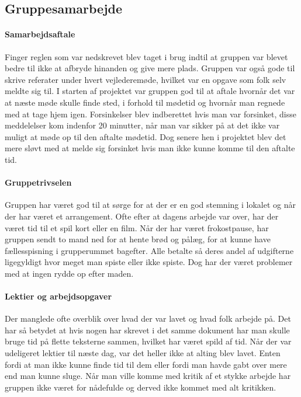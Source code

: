 \subsection{Gruppesamarbejde}
\paragraph{Samarbejdsaftale}
Finger reglen som var nedskrevet blev taget i brug indtil at gruppen var blevet bedre til ikke at afbryde hinanden og give mere plads. Gruppen var også gode til skrive referater under hvert vejlederemøde, hvilket var en opgave som folk selv meldte sig til. I starten af projektet var gruppen god til at aftale hvornår det var at næste møde skulle finde sted, i forhold til mødetid og hvornår man regnede med at tage hjem igen. Forsinkelser blev indberettet hvis man var forsinket, disse meddelelser kom indenfor 20 minutter, når man var sikker på at det ikke var muligt at møde op til den aftalte mødetid. Dog senere hen i projektet blev det mere sløvt med at melde sig forsinket hvis man ikke kunne komme til den aftalte tid.

\paragraph{Gruppetrivselen}
Gruppen har været god til at sørge for at der er en god stemning i lokalet og når der har været et arrangement. Ofte efter at dagens arbejde var over, har der været tid til et spil kort eller en film. Når der har været frokostpause, har gruppen sendt to mand ned for at hente brød og pålæg, for at kunne have fællesspisning i grupperummet bagefter. Alle betalte så deres andel af udgifterne ligegyldigt hvor meget man spiste eller ikke spiste. Dog har der været problemer med at ingen rydde op efter maden.

\paragraph{Lektier og arbejdsopgaver}
Der manglede ofte overblik over hvad der var lavet og hvad folk arbejde på. Det har så betydet at hvis nogen har skrevet i det samme dokument har man skulle bruge tid på flette teksterne sammen, hvilket har været spild af tid. Når der var udeligeret lektier til næste dag, var det heller ikke at alting blev lavet. Enten fordi at man ikke kunne finde tid til dem eller fordi man havde gabt over mere end man kunne sluge. Når man ville komme med kritik af et stykke arbejde har gruppen ikke været for nådefulde og derved ikke kommet med alt kritikken. 